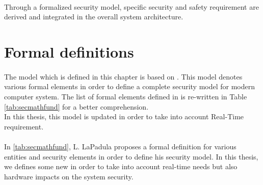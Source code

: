 \paragraph{}
Through a formalized security model, specific security and safety requirement are derived and
integrated in the overall system architecture.

\section{Formal definitions}

\paragraph{}
The model which is defined in this chapter is based on \cite{secmathfund}. This model denotes
various formal elements in order to define a complete security model for modern computer system.
The list of formal elements defined in \cite{secmathfund} is re-written in Table
\ref{tab:secmathfund} for a better comprehension.\\
In this thesis, this model is updated in order to take into account Real-Time requirement.

\paragraph{}
In \ref{tab:secmathfund}, L. LaPadula proposes a formal definition for various entities and
security elements in order to define his security model. In this thesis, we defines some new
in order to take into account real-time needs but also hardware impacts on the system security.

